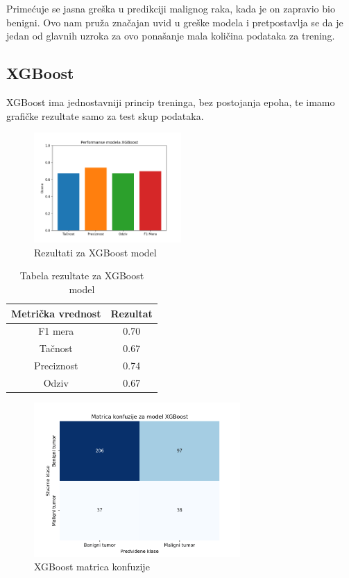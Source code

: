 \documentclass{article}
\begin{document}
Primećuje se jasna greška u predikciji malignog raka, kada je on zapravio bio benigni. Ovo nam pruža značajan uvid u greške modela i pretpostavlja se da je jedan od glavnih uzroka za ovo ponašanje mala količina podataka za trening.

\subsection{XGBoost}

XGBoost ima jednostavniji princip treninga, bez postojanja epoha, te imamo grafičke rezultate samo za test skup podataka.

\begin{figure}[H]
    \centering
    \includegraphics[width=0.5\textwidth]{rezultati/XGBoost_rezultati.png} 
    \caption{Rezultati za XGBoost model} 
    \label{XGBoost rezultati}
\end{figure}

\begin{table}[H]
    \centering
    \begin{tabular}{|c|c|}
        \hline
        \textbf{Metrička vrednost} & \textbf{Rezultat} \\ \hline
        F1 mera & 0.70 \\ \hline
        Tačnost & 0.67 \\ \hline
        Preciznost & 0.74 \\ \hline
        Odziv & 0.67 \\ \hline
    \end{tabular}
    \caption{Tabela rezultate za XGBoost model}
    \label{tab:XGBoost tabela rezultata}
\end{table}

\begin{figure}[H]
    \centering
    \includegraphics[width=0.7\textwidth]{rezultati/XGBoost_matrica_konfuzije.png} 
    \caption{XGBoost matrica konfuzije} 
    \label{XGBoost matrica konfuzije}
\end{figure}
\end{document}
